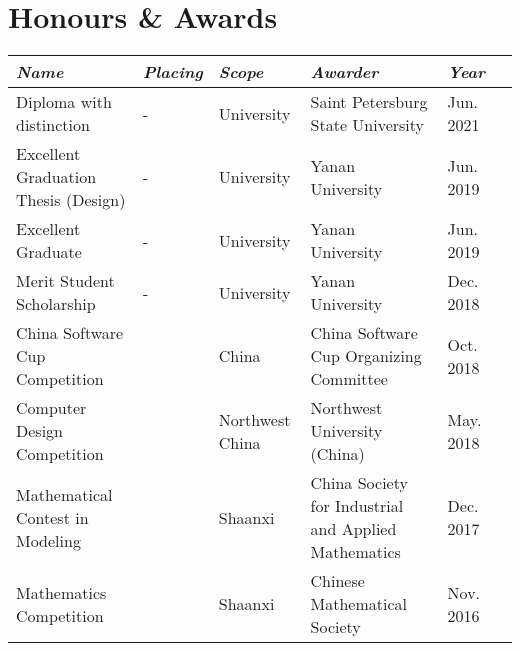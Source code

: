 \documentclass[letterpaper,10pt]{article}
\newcommand{\awardsTable}[1]{
	\begin{tabularx}{\textwidth}{llllll}
	\emph{Name}	& \emph{Placing}	& \emph{Scope}	& \emph{Awarder} & \emph{Year}       \\
	\midrule\midrule
	#1
	\end{tabularx}
}
\newcommand{\awardsTableRow}[6]{
	\BeginAccSupp{method=plain, ActualText=11\string\t 21}#1 & #2 & #3 & #4 & #5\EndAccSupp{} \\
}
\begin{document}
\section{Honours \& Awards}
\setlength{\tabcolsep}{6.0pt}
\renewcommand{\arraystretch}{1.1}
\fontsize{8.5}{11}\selectfont
\awardsTable{
  \awardsTableRow{Diploma with distinction}{-}{University}{Saint Petersburg
                  State University}{Jun. 2021} \\
  \awardsTableRow{Excellent Graduation Thesis (Design)}{-}{University}{Yanan
                  University}{Jun. 2019} \\
  \awardsTableRow{Excellent Graduate}{-}{University}{Yanan University}{Jun.
                  2019} \\
  \awardsTableRow{Merit Student Scholarship}{-}{University}{Yanan
                  University}{Dec. 2018} \\
  \awardsTableRow{China Software Cup Competition}{\nth{3}}{China}{China
                  Software Cup Organizing Committee}{Oct. 2018} \\
  \awardsTableRow{Computer Design Competition}{\nth{3}}{Northwest
                  China}{Northwest University (China)}{May. 2018} \\
  \awardsTableRow{Mathematical Contest in Modeling}{\nth{2}}{Shaanxi}{China
                  Society for Industrial and Applied Mathematics}{Dec. 2017} \\
  \awardsTableRow{Mathematics Competition}{\nth{3}}{Shaanxi}{Chinese
                  Mathematical Society}{Nov. 2016} \\ \hline }
\end{document}
